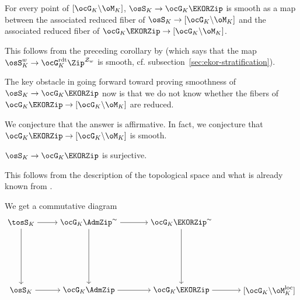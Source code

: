 \documentclass[a4paper]{scrartcl} %
\numberwithin{equation}{section}
\begin{document}
\begin{Corollary}
  For every point of $[\ocG_K\backslash\oM_K]$, $\osS_K\to \ocG_K\EKORZip$ is smooth as a map between the associated reduced fiber of $\osS_K \to [\ocG_K\backslash\oM_K]$ and the associated reduced fiber of $\ocG_K\EKORZip \to [\ocG_K\backslash\oM_K]$.
\end{Corollary}

\begin{Proof}
  This follows from the preceding corollary by \cite[Theorem~A]{SYZnew} (which says that the map $\osS_{K}^w\to\ocG_K^\mathrm{rdt}\Zip^{\mathcal{Z}_w}$ is smooth, cf. subsection~\ref{sec:ekor-stratification}).
\end{Proof}

The key obstacle in going forward toward proving smoothness of $\osS_K \to \ocG_K\EKORZip$ now is that
we do not know whether the fibers of $\ocG_K\EKORZip \to [\ocG_K\backslash\oM_K]$ are reduced.

\begin{Conjecture}
  We conjecture that the answer is affirmative. In fact, we conjecture that $\ocG_K\EKORZip \to [\ocG_K\backslash\oM_K]$ is smooth.
\end{Conjecture}




\begin{Corollary}
  $\osS_K\to\ocG_K\EKORZip$ is surjective.
\end{Corollary}

\begin{Proof}
  This follows from the description of the topological space and what is already known from \cite[first paragraph of section~6.3]{he-rapo}.
\end{Proof}


We get a commutative diagram
\begin{equation*}
  \begin{tikzpicture}[node distance=4cm, auto]
    \node (LM) at (0,3) {$\tosS_K$};
    \node (RM) at (3,3) {$\ocG_K\AdmZip^\sim$};
    \node (RRM) at (7.1,3) {$\ocG_K\EKORZip^\sim$};
    \node (LU) at (0,0) {$\osS_K$};
    \node (RU) at (3,0) {$\ocG_K\AdmZip$};
    \node (RRU) at (7.1,0) {$\ocG_K\EKORZip$};
    \node (RRRU) at (11,0) {$[\ocG_K\backslash\oM^\mathrm{loc}_K]$};
    
    \draw[->] (LM) to  (LU);
    \draw[->] (RM) to  (RU);
    \draw[->] (RRM) to  (RRU);
    \draw[->] (LM) to  (RM);
    \draw[->] (LU) to  (RU);
    \draw[->] (RM) to (RRM);
    \draw[->] (RU) to  (RRU);
    \draw[->] (RRU) to  (RRRU);
  \end{tikzpicture}
\end{equation*}
\end{document}
